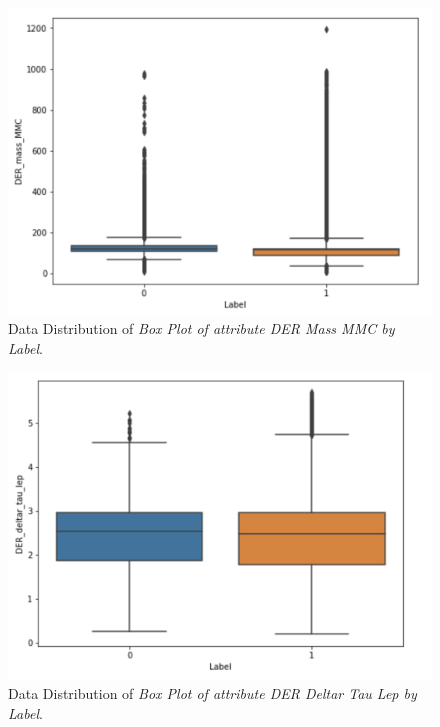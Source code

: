 \documentclass[conference]{IEEEtran}
\begin{document}
\begin{figure}[htbp]
\centerline{\includegraphics[width=\linewidth]{img4.png}}
\caption{Data Distribution of \textit{Box Plot of attribute \textit{DER Mass MMC} by \textit{Label}}.}
\label{fig}
\end{figure}


\begin{figure}[htbp]
\centerline{\includegraphics[width=\linewidth]{img5.png}}
\caption{Data Distribution of \textit{Box Plot of attribute \textit{DER Deltar Tau Lep} by \textit{Label}}.}
\label{fig}
\end{figure}
\end{document}
